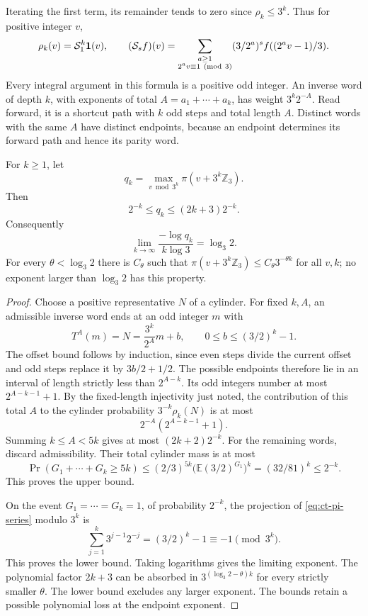 Iterating the first term, its remainder tends to zero since
\(\rho_k\le3^k\). Thus for positive integer \(v\),
\begin{equation}\label{eq:ct-odd-blocks}
 \rho_k(v)=\mathcal S_1^k\mathbf1(v),\qquad
 (\mathcal S_s f)(v)
 =\sum_{\substack{a\ge1\\2^av\equiv1\ ({\rm mod}\ 3)}}
       (3/2^a)^s f((2^av-1)/3).
\end{equation}
Every integral argument in this formula is a positive odd integer.
An inverse word of depth \(k\), with exponents of total
\(A=a_1+\cdots+a_k\), has weight \(3^k2^{-A}\).
Read forward, it is a shortcut path with \(k\) odd steps and
total length \(A\). Distinct words with the same \(A\) have
distinct endpoints, because an endpoint determines its forward
path and hence its parity word.

\begin{proposition}\label{prop:ct-cylinder-max}
For \(k\ge1\), let
\[
 q_k=\max_{v\bmod3^k}\pi(v+3^k\mathbb Z_3).
\]
Then
\begin{equation}\label{eq:ct-cylinder-max}
 2^{-k}\le q_k\le(2k+3)2^{-k}.
\end{equation}
Consequently
\[
 \lim_{k\to\infty}\frac{-\log q_k}{k\log3}=\log_3 2.
\]
For every \(\theta<\log_3 2\) there is \(C_\theta\) such that
\(\pi(v+3^k\mathbb Z_3)\le C_\theta3^{-\theta k}\)
for all \(v,k\); no exponent larger than \(\log_3 2\) has
this property.
\end{proposition}
\begin{proof}
Choose a positive representative \(N\) of a cylinder. For fixed
\(k,A\), an admissible inverse word ends at an odd integer \(m\)
with
\[
 T^A(m)=N=\frac{3^k}{2^A}m+b,\qquad
 0\le b\le(3/2)^k-1.
\]
The offset bound follows by induction, since even steps divide
the current offset and odd steps replace it by \(3b/2+1/2\).
The possible endpoints therefore lie in an interval of length
strictly less than \(2^{A-k}\). Its odd integers number at most
\(2^{A-k-1}+1\). By the fixed-length injectivity just noted,
the contribution of this total \(A\) to the cylinder probability
\(3^{-k}\rho_k(N)\) is at most
\[
 2^{-A}(2^{A-k-1}+1).
\]
Summing \(k\le A<5k\) gives at most
\((2k+2)2^{-k}\). For the remaining words, discard admissibility.
Their total cylinder mass is at most
\[
 \Pr(G_1+\cdots+G_k\ge5k)
 \le(2/3)^{5k}\bigl(\mathbb E(3/2)^{G_1}\bigr)^k
 =(32/81)^k\le2^{-k}.
\]
This proves the upper bound.

On the event \(G_1=\cdots=G_k=1\), of probability \(2^{-k}\),
the projection of \eqref{eq:ct-pi-series} modulo \(3^k\) is
\[
 \sum_{j=1}^k3^{j-1}2^{-j}=(3/2)^k-1\equiv-1\pmod{3^k}.
\]
This proves the lower bound. Taking logarithms gives the limiting
exponent. The polynomial factor \(2k+3\) can be absorbed in
\(3^{(\log_3 2-\theta)k}\) for every strictly smaller \(\theta\).
The lower bound excludes any larger exponent. The bounds retain
a possible polynomial loss at the endpoint exponent.
\end{proof}

